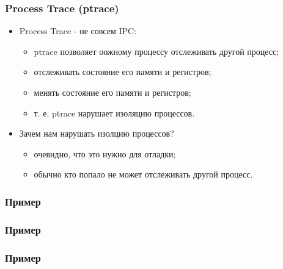 \begin{frame}
\frametitle{Process Trace (ptrace)}
\begin{itemize}
  \item Process Trace - не совсем IPC:
  \begin{itemize}
    \item ptrace позволяет оожному процессу отслеживать другой процесс;
    \item отслеживать состояние его памяти и регистров;
    \item менять состояние его памяти и регистров;
    \item т. е. ptrace нарушает изоляцию процессов.
  \end{itemize}
  \item Зачем нам нарушать изолцию процессов?
  \begin{itemize}
    \item очевидно, что это нужно для отладки;
    \item обычно кто попало не может отслеживать другой процесс.
  \end{itemize}
\end{itemize}
\end{frame}

\begin{frame}[fragile]
\frametitle{Пример}

\end{frame}

\begin{frame}[fragile]
\frametitle{Пример}


\end{frame}

\begin{frame}[fragile]
\frametitle{Пример}

\end{frame}
